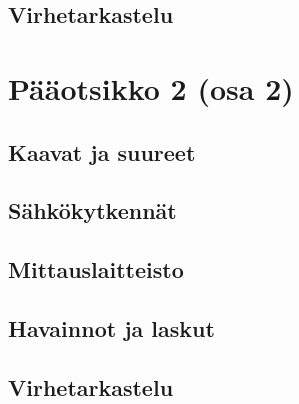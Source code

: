 \documentclass[a4paper,12pt]{article}
\begin{document}

\subsection{Virhetarkastelu}





\section{Pääotsikko 2 (osa 2)}

\subsection{Kaavat ja suureet}

\subsection{Sähkökytkennät}

\subsection{Mittauslaitteisto}

\subsection{Havainnot ja laskut}

\subsection{Virhetarkastelu}

\end{document}
